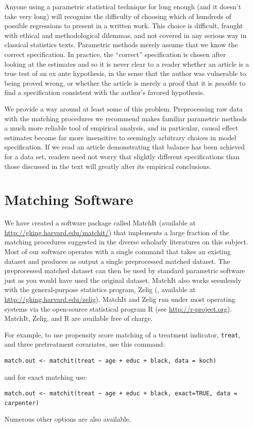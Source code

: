 \documentclass[11pt,titlepage]{article}
\begin{document}
Anyone using a parametric statistical technique for long enough (and
it doesn't take very long) will recognize the difficulty of choosing
which of hundreds of possible regressions to present in a written
work.  This choice is difficult, fraught with ethical and
methodological dilemmas, and not covered in any serious way in
classical statistics texts.  Parametric methods merely assume that we
know the correct specification.  In practice, the ``correct''
specification is chosen after looking at the estimates and so it is
never clear to a reader whether an article is a true test of an ex
ante hypothesis, in the sense that the author was vulnerable to being
proved wrong, or whether the article is merely a proof that it is
\emph{possible} to find a specification consistent with the author's
favored hypothesis.

We provide a way around at least some of this problem.  Preprocessing
raw data with the matching procedures we recommend makes familiar
parametric methods a much more reliable tool of empirical analysis,
and in particular, causal effect estimates become far more insensitive
to seemingly arbitrary choices in model specification.  If we read an
article demonstrating that balance has been achieved for a data set,
readers need not worry that slightly different specifications than
those discussed in the text will greatly alter its empirical
conclusions.

\appendix
\section{Matching Software}\label{s:matchit}

We have created a software package called MatchIt (available at
\url{http://gking.harvard.edu/matchit/}) that implements a large
fraction of the matching procedures suggested in the diverse scholarly
literatures on this subject.  Most of our software operates with a
single command that takes an existing dataset and produces as output a
single preprocessed matched dataset.  The preprocessed matched dataset
can then be used by standard parametric software just as you would
have used the original dataset.  MatchIt also works seemlessly with
the general-purpose statistics program, Zelig (\citet{ImaKinLau04},
available at \url{http://gking.harvard.edu/zelig}).  MatchIt and Zelig
run under most operating systems via the open-source statistical
program R (see \url{http://r-project.org}).  MatchIt, Zelig, and R are
available free of charge.

For example, to use propensity score matching of a treatment
indicator, \texttt{treat}, and three pretreatment covariates, use this
command:
\begin{verbatim}
match.out <- matchit(treat ~ age + educ + black, data = koch)
\end{verbatim}
and for exact matching use:
\begin{verbatim}
match.out <- matchit(treat ~ age + educ + black, exact=TRUE, data = carpenter)
\end{verbatim}
Numerous other options are also available.
\end{document}
